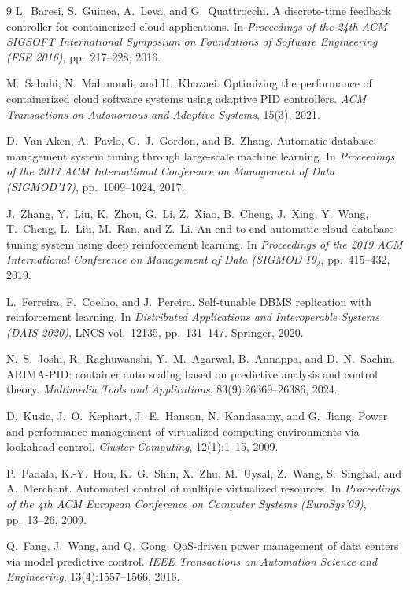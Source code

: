 \documentclass[smallextended]{svjour3}
\begin{document}
\begin{thebibliography}{9}
L.\ Baresi, S.\ Guinea, A.\ Leva, and G.\ Quattrocchi.
\newblock A discrete-time feedback controller for containerized cloud
  applications.
\newblock In \emph{Proceedings of the 24th ACM SIGSOFT International
  Symposium on Foundations of Software Engineering (FSE 2016)}, pp.\
  217--228, 2016.

M.\ Sabuhi, N.\ Mahmoudi, and H.\ Khazaei.
\newblock Optimizing the performance of containerized cloud software
  systems using adaptive PID controllers.
\newblock \emph{ACM Transactions on Autonomous and Adaptive Systems},
  15(3), 2021.

D.\ Van Aken, A.\ Pavlo, G.\ J.\ Gordon, and B.\ Zhang.
\newblock Automatic database management system tuning through
  large-scale machine learning.
\newblock In \emph{Proceedings of the 2017 ACM International
  Conference on Management of Data (SIGMOD'17)}, pp.\ 1009--1024, 2017.

J.\ Zhang, Y.\ Liu, K.\ Zhou, G.\ Li, Z.\ Xiao, B.\ Cheng, J.\ Xing,
  Y.\ Wang, T.\ Cheng, L.\ Liu, M.\ Ran, and Z.\ Li.
\newblock An end-to-end automatic cloud database tuning system using
  deep reinforcement learning.
\newblock In \emph{Proceedings of the 2019 ACM International
  Conference on Management of Data (SIGMOD'19)}, pp.\ 415--432, 2019.

L.\ Ferreira, F.\ Coelho, and J.\ Pereira.
\newblock Self-tunable DBMS replication with reinforcement learning.
\newblock In \emph{Distributed Applications and Interoperable Systems
  (DAIS 2020)}, LNCS vol.\ 12135, pp.\ 131--147. Springer, 2020.

N.\ S.\ Joshi, R.\ Raghuwanshi, Y.\ M.\ Agarwal, B.\ Annappa, and
  D.\ N.\ Sachin.
\newblock ARIMA-PID: container auto scaling based on predictive
  analysis and control theory.
\newblock \emph{Multimedia Tools and Applications}, 83(9):26369--26386,
  2024.

D.\ Kusic, J.\ O.\ Kephart, J.\ E.\ Hanson, N.\ Kandasamy, and G.\ Jiang.
\newblock Power and performance management of virtualized computing
  environments via lookahead control.
\newblock \emph{Cluster Computing}, 12(1):1--15, 2009.

P.\ Padala, K.-Y.\ Hou, K.\ G.\ Shin, X.\ Zhu, M.\ Uysal, Z.\ Wang,
  S.\ Singhal, and A.\ Merchant.
\newblock Automated control of multiple virtualized resources.
\newblock In \emph{Proceedings of the 4th ACM European Conference on
  Computer Systems (EuroSys'09)}, pp.\ 13--26, 2009.

Q.\ Fang, J.\ Wang, and Q.\ Gong.
\newblock QoS-driven power management of data centers via model
  predictive control.
\newblock \emph{IEEE Transactions on Automation Science and
  Engineering}, 13(4):1557--1566, 2016.
\end{thebibliography}
\end{document}
